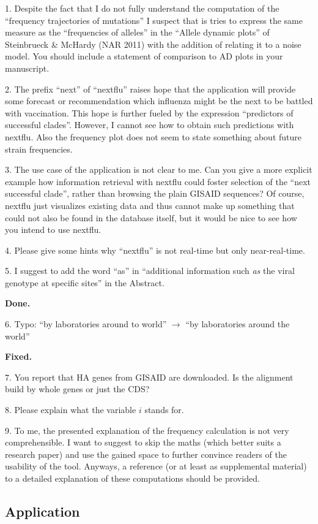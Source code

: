 \documentclass[11pt,oneside,letterpaper]{article}
\begin{document}
1. Despite the fact that I do not fully understand the computation of the ``frequency trajectories of mutations'' I suspect that is tries to express the same measure as the ``frequencies of alleles'' in the ``Allele dynamic plots'' of Steinbrueck \& McHardy (NAR 2011) with the addition of relating it to a noise model. You should include a statement of comparison to AD  plots in your manuscript.

2. The prefix ``next'' of ``nextflu'' raises hope that the application will provide some forecast or recommendation which influenza might be the next to be battled with vaccination. This hope is further fueled by the expression ``predictors of successful clades''. However, I cannot see how to obtain such predictions with nextflu. Also the frequency plot does not seem to state something about future strain frequencies.

3. The use case of the application is not clear to me. Can you give a more explicit example how information retrieval with nextflu could foster selection of the ``next successful clade'', rather than browsing the plain GISAID sequences? Of course, nextflu just visualizes existing data and thus cannot make up something that could not also be found in the database itself, but it would be nice to see how you intend to use nextflu.

4. Please give some hints why ``nextflu'' is not real-time but only near-real-time.

5. I suggest to add the word ``as'' in ``additional information such \textit{as} the viral genotype at specific sites'' in the Abstract.

\textbf{Done.}

6. Typo: ``by laboratories around to world'' $\rightarrow$ ``by laboratories around the world''

\textbf{Fixed.}

7. You report that HA genes from GISAID are downloaded. Is the alignment build by whole genes or just the CDS?

8. Please explain what the variable $i$ stands for.

9. To me, the presented explanation of the frequency calculation is not very comprehensible. I want to suggest to skip the maths (which better suits a research paper) and use the gained space to further convince readers of the usability of the tool. Anyways, a reference (or at least as supplemental material) to a detailed explanation of these computations should be provided.

\subsection*{Application}
\end{document}
